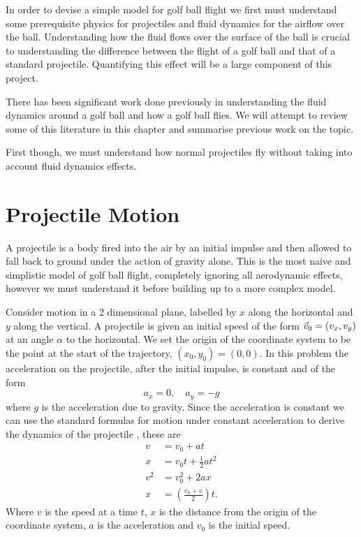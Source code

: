In order to devise a simple model for golf ball flight we first must understand some
prerequisite physics for projectiles and fluid dynamics for the airflow over the ball. Understanding
how the fluid flows over the surface of the ball is crucial to understanding the difference between
the flight of a golf ball and that of a standard projectile. Quantifying this effect will be a large
component of this project.

There has been significant work done previously in understanding the fluid dynamics around a golf ball
and how a golf ball flies. We will attempt to review some of this literature in this chapter and summarise
previous work on the topic.

First though, we must understand how normal projectiles fly without taking into account fluid dynamics effects.
\section{Projectile Motion}
A projectile is a body fired into the air by an initial impulse and then allowed to fall back to ground under the
action of gravity alone. This is the most naive and simplistic model of golf ball flight, completely
ignoring all aerodynamic effects, however we must understand it before building up to a more
complex model.

Consider motion in a 2 dimensional plane, labelled by $x$ along the horizontal and $y$ along the vertical.
A projectile is given an initial speed of the form $\vec{v}_0 = (v_x, v_y)$ at an angle $\alpha$ to
the horizontal. We set the origin of the coordinate system to be the point at the start of the
trajectory, $(x_0, y_0) = (0,0)$. In this problem the acceleration on the projectile, after the initial
impulse, is constant and of the form
\begin{equation} \label{grav}
a_x = 0, \quad a_y = -g
\end{equation}
where $g$ is the acceleration due to gravity. Since the acceleration is constant we can use
the standard formulas for motion under constant acceleration to derive the dynamics of the
projectile \citet{yandf}, these are
\begin{subequations} \label{suvat}
\begin{align}
v &= v_0 + at \label{v} \\
x &= v_0 t + \frac{1}{2} a t^2 \label{xsuvat} \\
v^2 &= v_0^2 + 2ax \\
x &= \left(\frac{v_0 + v}{2}\right) t .
\end{align}
\end{subequations}
Where $v$ is the speed at a time $t$, $x$ is the distance from the origin of the coordinate system,
$a$ is the acceleration and $v_0$ is the initial speed.

